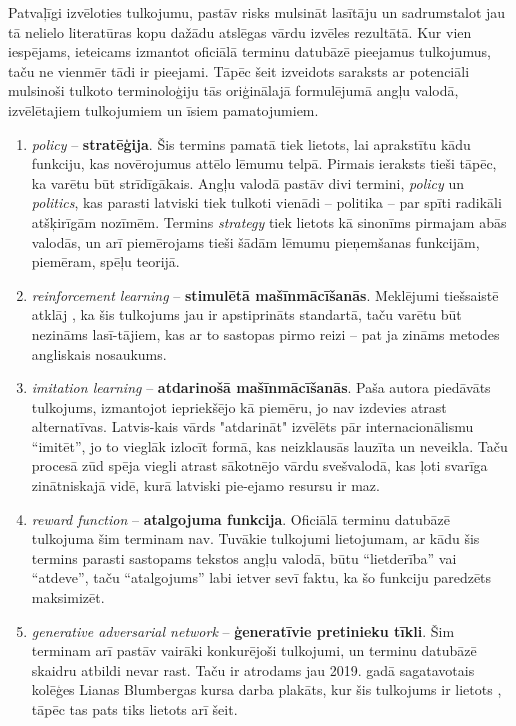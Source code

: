 \documentclass[12pt, a4paper]{article}
\numberwithin{equation}{section} %
\begin{document}
Patvaļīgi izvēloties tulkojumu, pastāv risks mulsināt lasītāju un sadrumstalot jau tā nelielo literatūras kopu dažādu atslēgas vārdu izvēles rezultātā. Kur vien iespējams, ieteicams izmantot oficiālā terminu datubāzē pieejamus tulkojumus, taču ne vienmēr tādi ir pieejami. Tāpēc šeit izveidots saraksts ar potenciāli mulsinoši tulkoto terminoloģiju tās oriģinālajā formulējumā angļu valodā, izvēlētajiem tulkojumiem un īsiem pamatojumiem.  

\begin{enumerate}
    \item \textit{policy} -- \textbf{stratēģija}. Šis termins pamatā tiek lietots, lai aprakstītu kādu funkciju, kas novērojumus attēlo lēmumu telpā. Pirmais ieraksts tieši tāpēc, ka varētu būt strīdīgākais. Angļu valodā pastāv divi termini, \textit{policy} un \textit{politics}, kas parasti latviski tiek tulkoti vienādi -- politika -- par spīti radikāli atšķirīgām nozīmēm. Termins \textit{strategy} tiek lietots kā sinonīms pirmajam abās valodās, un arī piemērojams tieši šādām lēmumu pieņemšanas funkcijām, piemēram, spēļu teorijā.
    \item \textit{reinforcement learning} -- \textbf{stimulētā mašīnmācīšanās}. Meklējumi tiešsaistē atklāj \cite{enc_stim}, ka šis tulkojums jau ir apstiprināts standartā, taču varētu būt nezināms lasī-tājiem, kas ar to sastopas pirmo reizi -- pat ja zināms metodes angliskais nosaukums.
    \item \textit{imitation learning} -- \textbf{atdarinošā mašīnmācīšanās}. Paša autora piedāvāts tulkojums, izmantojot iepriekšējo kā piemēru, jo nav izdevies atrast alternatīvas. Latvis-kais vārds "atdarināt" izvēlēts pār internacionālismu ``imitēt'', jo to vieglāk izlocīt formā, kas neizklausās lauzīta un neveikla. Taču procesā zūd spēja viegli atrast sākotnējo vārdu svešvalodā, kas ļoti svarīga zinātniskajā vidē, kurā latviski pie-ejamo resursu ir maz.
    \item \textit{reward function} -- \textbf{atalgojuma funkcija}. Oficiālā terminu datubāzē tulkojuma šim terminam nav. Tuvākie tulkojumi lietojumam, ar kādu šis termins parasti sastopams tekstos angļu valodā, būtu ``lietderība'' vai ``atdeve'', taču ``atalgojums'' labi ietver sevī faktu, ka šo funkciju paredzēts maksimizēt.
    \item \textit{generative adversarial network} -- \textbf{ģeneratīvie pretinieku tīkli}. Šim terminam arī pastāv vairāki konkurējoši tulkojumi, un terminu datubāzē skaidru atbildi nevar rast. Taču ir atrodams jau 2019. gadā sagatavotais kolēģes Lianas Blumbergas kursa darba plakāts, kur šis tulkojums ir lietots \cite{GAN}, tāpēc tas pats tiks lietots arī šeit.
\end{enumerate}
\end{document}
